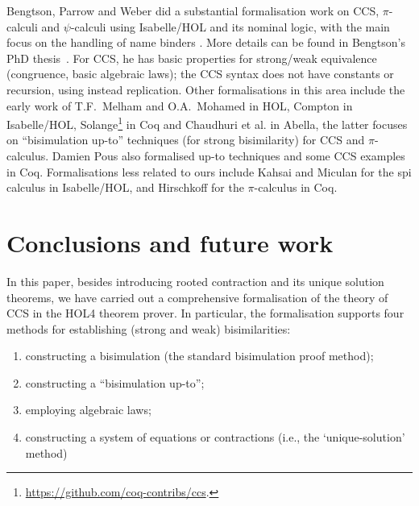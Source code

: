 \documentclass[GCNS]{yincog}
\theoremstyle{remark}
\theoremstyle{theorem}
\theoremstyle{remark}
\begin{document}
Bengtson, Parrow and Weber did a substantial formalisation work on CCS,
$\pi $-calculi and $\psi $-calculi using Isabelle/HOL and its nominal logic,
with the main focus on the handling of name binders
\cite{bengtson2007completeness,parrow2009formalising}. More details can
be found in Bengtson's PhD thesis~\cite{bengtson2010formalising}. For CCS,
he has  basic properties for strong/weak equivalence (congruence,
basic algebraic laws); the CCS syntax does not have constants or recursion,
using instead replication. Other formalisations in this area include the
early work of T.F.~Melham \cite{melham1994mechanized} and O.A.~Mohamed
\cite{mohamed1995mechanizing} in HOL, Compton
\cite{compton2005embedding} in Isabelle/HOL, Solange\footnote{\url{https://github.com/coq-contribs/ccs}.}
in Coq and Chaudhuri et al.\;\cite{chaudhuri2015lightweight} in Abella,
the latter focuses on ``bisimulation up-to'' techniques (for strong bisimilarity)
for CCS and $\pi $-calculus. Damien Pous \cite{pous2007new} also formalised
up-to techniques and some CCS examples in Coq. Formalisations less related
to ours include Kahsai and Miculan \cite{kahsai2008implementing} for the
spi calculus in Isabelle/HOL, and Hirschkoff
\cite{hirschkoff1997full} for the $\pi $-calculus in Coq.

\section{Conclusions and future work}
 \label{s:concl}

In this paper, besides introducing rooted contraction and its unique solution
theorems, we have carried out a comprehensive formalisation of the theory
of CCS in the HOL4 theorem prover. In particular, the formalisation supports
four methods for establishing (strong and weak) bisimilarities:
%
\begin{enumerate}
%
\item constructing a bisimulation (the standard bisimulation proof method);
%
\item constructing a ``bisimulation up-to'';
%
\item employing algebraic laws;
%
\item constructing a system of equations or contractions (i.e., the `unique-solution'
method)
%
\end{enumerate}
\end{document}

